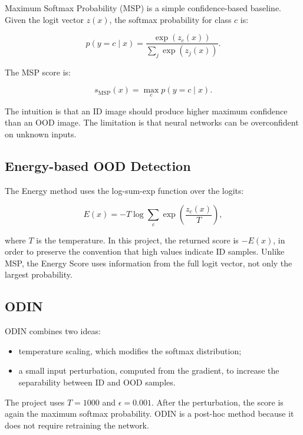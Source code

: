 \documentclass[11pt,a4paper]{article}
\begin{document}
Maximum Softmax Probability (MSP) is a simple confidence-based baseline.
Given the logit vector $z(x)$, the softmax probability for class $c$ is:

\begin{equation}
    p(y=c \mid x) = \frac{\exp(z_c(x))}{\sum_j \exp(z_j(x))}.
\end{equation}

The MSP score is:

\begin{equation}
    s_{\text{MSP}}(x) = \max_c p(y=c \mid x).
\end{equation}

The intuition is that an ID image should produce higher maximum confidence than an OOD image.
The limitation is that neural networks can be overconfident on unknown inputs.

\subsection{Energy-based OOD Detection}

The Energy method uses the log-sum-exp function over the logits:

\begin{equation}
    E(x) = -T \log \sum_c \exp\left(\frac{z_c(x)}{T}\right),
\end{equation}

where $T$ is the temperature.
In this project, the returned score is $-E(x)$, in order to preserve the convention that high values indicate ID samples.
Unlike MSP, the Energy Score uses information from the full logit vector, not only the largest probability.

\subsection{ODIN}

ODIN combines two ideas:

\begin{itemize}
    \item temperature scaling, which modifies the softmax distribution;
    \item a small input perturbation, computed from the gradient, to increase the separability between ID and OOD samples.
\end{itemize}

The project uses $T=1000$ and $\epsilon=0.001$.
After the perturbation, the score is again the maximum softmax probability.
ODIN is a post-hoc method because it does not require retraining the network.
\end{document}
